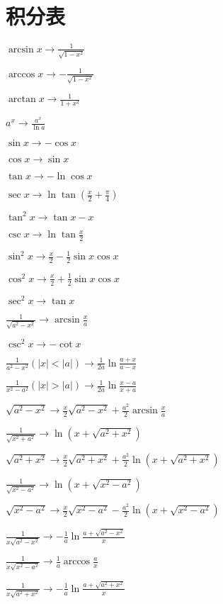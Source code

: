 \section{积分表}
\newcommand{\ud}{\mathrm{d}}
$\arcsin x \to \frac{1}{\sqrt{1-x^2}}				   $\par
$\arccos x \to -\frac{1}{\sqrt{1-x^2}}				  $\par
$\arctan x \to \frac{1}{1+x^2}						  $\par
$a^x \to \frac{a^x}{\ln a}							  $\par
$\sin x \to -\cos x									 $\par
$\cos x \to \sin x									  $\par
$\tan x \to -\ln\cos x								  $\par
$\sec x \to \ln\tan(\frac{x}{2}+\frac{\pi}{4})		  $\par
$\tan^2 x \to \tan x - x								$\par
$\csc x \to \ln\tan\frac{x}{2}						  $\par
$\sin^2 x \to \frac{x}{2} - \frac{1}{2}\sin x\cos x	 $\par
$\cos^2 x \to \frac{x}{2} + \frac{1}{2}\sin x\cos x	 $\par
$\sec^2 x \to \tan x									$\par
$\frac{1}{\sqrt{a^2-x^2}} \to \arcsin\frac{x}{a}		$\par
$\csc^2 x \to -\cot x								   $\par
$\frac{1}{a^2-x^2}(|x|<|a|) \to \frac{1}{2a}\ln\frac{a+x}{a-x}  $\par
$\frac{1}{x^2-a^2}(|x|>|a|) \to \frac{1}{2a}\ln\frac{x-a}{x+a}  $\par
$\sqrt{a^2-x^2} \to \frac{x}{2}\sqrt{a^2-x^2}+\frac{a^2}{2}\arcsin\frac{x}{a}   $\par
$\frac{1}{\sqrt{x^2+a^2}} \to \ln(x+\sqrt{a^2+x^2}) $\par
$\sqrt{a^2+x^2} \to \frac{x}{2}\sqrt{a^2+x^2}+\frac{a^2}{2}\ln(x+\sqrt{a^2+x^2})$\par
$\frac{1}{\sqrt{x^2-a^2}} \to \ln(x+\sqrt{x^2-a^2})$\par
$\sqrt{x^2-a^2} \to \frac{x}{2}\sqrt{x^2-a^2}-\frac{a^2}{2}\ln(x+\sqrt{x^2-a^2})$\par
$\frac{1}{x\sqrt{a^2-x^2}} \to -\frac{1}{a}\ln\frac{a+\sqrt{a^2-x^2}}{x}$\par
$\frac{1}{x\sqrt{x^2-a^2}} \to \frac{1}{a}\arccos\frac{a}{x}$\par
$\frac{1}{x\sqrt{a^2+x^2}} \to -\frac{1}{a}\ln\frac{a+\sqrt{a^2+x^2}}{x}$\par
